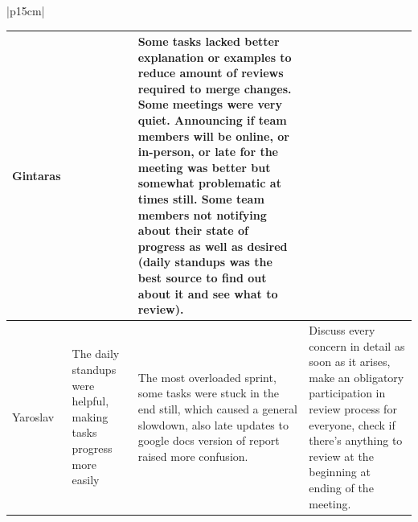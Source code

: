 \begin{table}[H]
    \centering
    \begin{tabular}{|p{15cm}|} 
        \hline
        \begin{table}[H]
            \begin{tabular}{|p{1.75cm}|p{4cm}|p{4cm}|p{4cm}|}
                \hline
                \cellcolor[HTML]{d4d4d4} Gintaras &  & Some tasks lacked better explanation or examples to reduce amount of reviews required to merge changes. Some meetings were very quiet. Announcing if team members will be online, or in-person, or late for the meeting was better but somewhat problematic at times still. Some team members not notifying about their state of progress as well as desired (daily standups was the best source to find out about it and see what to review). &  \\
                \hline
                \cellcolor[HTML]{d4d4d4} Yaroslav & The daily standups were helpful, making tasks progress more easily & The most overloaded sprint, some tasks were stuck in the end still, which caused a general slowdown, also late updates to google docs version of report raised more confusion. & Discuss every concern in detail as soon as it arises, make an obligatory participation in review process for everyone, check if there's anything to review at the beginning at ending of the meeting. \\
                \hline
            \end{tabular}
        \end{table}
        \\
        \hline
    \end{tabular}
\end{table}

